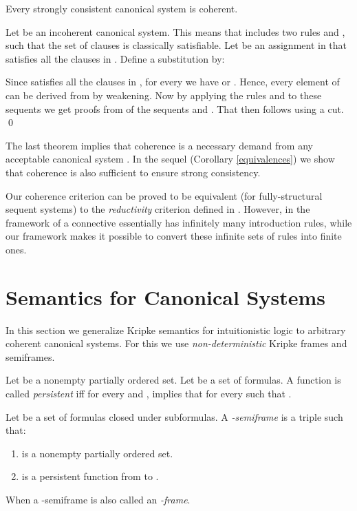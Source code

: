 \documentclass{LMCS}
\theoremstyle{remark}
\newcommand{\be}{\begin{enumerate}[(1)]}
\newcommand{\ee}{\end{enumerate}}
\begin{document}
\begin{thm}
\label{strong consistency -> coherence}
Every strongly consistent canonical system is coherent.
\end{thm}
\proof
Let  be an incoherent canonical system.
This means that  includes two rules  and
, such that the set of clauses
 is classically satisfiable. Let  be an assignment
in  that satisfies all the clauses in . 
Define a substitution  by:
 
Since  satisfies all the clauses in ,
for every  we have 
 or .
Hence, every element of  can be derived from  by weakening.
Now by applying the rules  and  
to these  sequents we get proofs from  of 
the sequents  and . 
That  then follows using a cut.
\qed

\noindent
The last theorem implies that coherence is a necessary
demand from any acceptable canonical system . 
In the sequel (Corollary \ref{equivalences})
we show that coherence is also sufficient 
to ensure strong consistency.




\begin{rem}
Our coherence criterion can be proved to be equivalent (for fully-structural sequent systems) 
to the {\em reductivity} criterion defined in \cite{CT06}. 
However,  in the framework of \cite{CT06} a connective
essentially has infinitely many introduction rules,
while our framework makes it possible to convert
these infinite sets of rules into  finite ones. 
\end{rem}

\section{Semantics for Canonical Systems}
\label{semantic section}

In this section we generalize Kripke semantics for intuitionistic logic
to arbitrary coherent canonical systems. For this we
use {\em non-deterministic} Kripke frames and semiframes.

\begin{defi}
\label{persistent}
Let  be a nonempty partially ordered set.
Let  be a set of formulas.
A function  is called {\em persistent}
iff for every  and ,
  implies that  for every 
such that .
\end{defi}

\begin{defi}
\label{semiframe}
Let  be a set of formulas closed under subformulas.
A {\em -semiframe} is a triple 
such that:
\be
\item  is a nonempty partially ordered set.
\item  is a persistent function from  to .
\ee
When  a -semiframe is also called an 
{\em -frame}.\end{defi}
\end{document}

